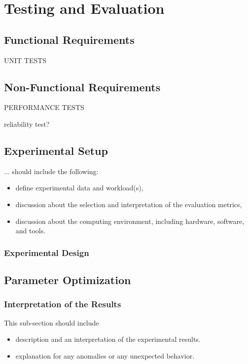 \chapter{Testing and Evaluation\label{cha:chapter5}}


\section{Functional Requirements}
UNIT TESTS

\section{Non-Functional Requirements}
PERFORMANCE TESTS\par
reliability test? 

\section{Experimental Setup\label{sec:exp}}
... should include the following:
\begin{itemize}

\item define experimental data and workload(s),
\item discussion about the selection and interpretation of the evaluation metrics,
\item discussion about the computing environment, including hardware, software, and tools.
\end{itemize}

\subsection{Experimental Design}


\section{Parameter Optimization\label{sec:parameterOptimization}}


\subsection{Interpretation of the Results}
This sub-section should include
\begin{itemize}
\item description and an interpretation of the experimental results.
\item explanation for any anomalies or any unexpected behavior.
\end{itemize}


